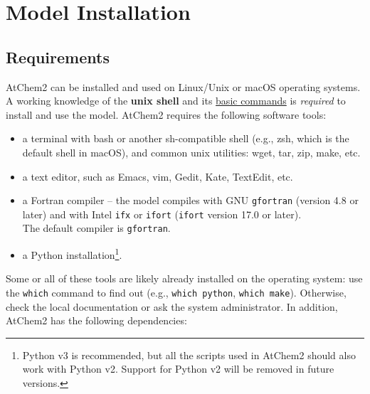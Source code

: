 %
%
%
%

\chapter{Model Installation} \label{ch:installation}

\section{Requirements} \label{sec:requirements}

AtChem2 can be installed and used on Linux/Unix or macOS operating systems. A working knowledge
of the \textbf{unix shell} and its \href{https://swcarpentry.github.io/shell-novice}{basic
  commands} is \emph{required} to install and use the model. AtChem2 requires the following
software tools:

\begin{itemize}
\item a terminal with bash or another sh-compatible shell (e.g., zsh, which is the default shell
  in macOS), and common unix utilities: wget, tar, zip, make, etc.
\item a text editor, such as Emacs, vim, Gedit, Kate, TextEdit, etc.
\item a Fortran compiler -- the model compiles with GNU \texttt{gfortran} (version 4.8 or
  later) and with Intel \texttt{ifx} or \texttt{ifort} (\texttt{ifort} version 17.0 or later).\\
  The default compiler is \texttt{gfortran}.
\item a Python installation\footnote{Python v3 is recommended, but all the scripts used in
    AtChem2 should also work with Python v2. Support for Python v2 will be removed in future
    versions.}.
\end{itemize}

Some or all of these tools are likely already installed on the operating system: use the
\verb|which| command to find out (e.g., \verb|which python|, \verb|which make|). Otherwise,
check the local documentation or ask the system administrator. In addition, AtChem2 has the
following dependencies:

